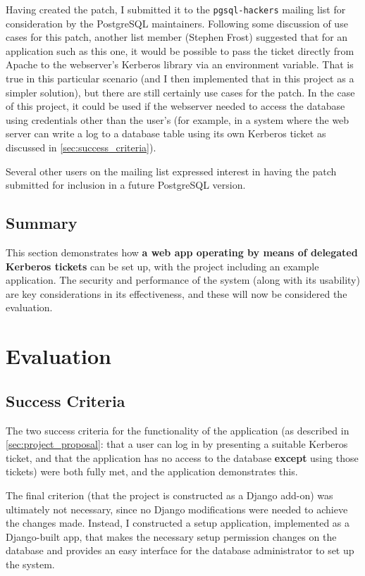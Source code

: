 \documentclass[12pt]{report}
\begin{document}
Having created the patch, I submitted it to the \texttt{pgsql-hackers} mailing list for consideration by the PostgreSQL maintainers\cite{postgres-patch-list}. Following some discussion of use cases for this patch, another list member (Stephen Frost) suggested that for an application such as this one, it would be possible to pass the ticket directly from Apache to the webserver's Kerberos library via an environment variable. That is true in this particular scenario (and I then implemented that in this project as a simpler solution), but there are still certainly use cases for the patch. In the case of this project, it could be used if the webserver needed to access the database using credentials other than the user's (for example, in a system where the web server can write a log to a database table using its own Kerberos ticket as discussed in \autoref{sec:success_criteria}).

Several other users on the mailing list expressed interest in having the patch submitted for inclusion in a future PostgreSQL version.

\section{Summary}
This section demonstrates how \textbf{a web app operating by means of delegated Kerberos tickets} can be set up, with the project including an example application. The security and performance of the system (along with its usability) are key considerations in its effectiveness, and these will now be considered the evaluation.

\chapter{Evaluation}

\section{Success Criteria}
\label{sec:success_criteria}
The two success criteria for the functionality of the application (as described in \autoref{sec:project_proposal}: that a user can log in by presenting a suitable Kerberos ticket, and that the application has no access to the database \textbf{except} using those tickets) were both fully met, and the application demonstrates this.

The final criterion (that the project is constructed as a Django add-on) was ultimately not necessary, since no Django modifications were needed to achieve the changes made. Instead, I constructed a setup application, implemented as a Django-built app, that makes the necessary setup permission changes on the database and provides an easy interface for the database administrator to set up the system.
\end{document}
